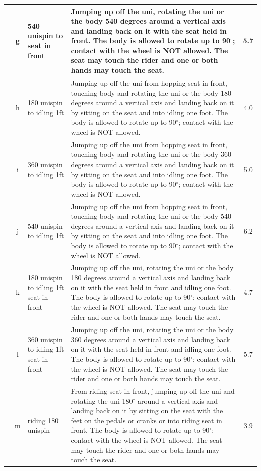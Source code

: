 \begin{longtable}{|r|c|p{4cm}|p{8cm}|c|}
\hline
  & g & 540 unispin to seat in front  & Jumping up off the uni, rotating the uni or the body 540 degrees around a vertical axis and landing back on it with the seat held in front. The body is allowed to rotate up to 90$^\circ$; contact with the wheel is NOT allowed. The seat may touch the rider and one or both hands may touch the seat.  & 5.7 \\ 
\hline
  & h & 180 unispin to idling 1ft & Jumping up off the uni from hopping seat in front, touching body and rotating the uni or the body 180 degrees around a vertical axis and landing back on it by sitting on the seat and into idling one foot. The body is allowed to rotate up to 90$^\circ$; contact with the wheel is NOT allowed.  & 4.0 \\ 
\hline
  & i & 360 unispin to idling 1ft & Jumping up off the uni from hopping seat in front, touching body and rotating the uni or the body 360 degrees around a vertical axis and landing back on it by sitting on the seat and into idling one foot. The body is allowed to rotate up to 90$^\circ$; contact with the wheel is NOT allowed.  & 5.0 \\ 
\hline
  & j & 540 unispin to idling 1ft & Jumping up off the uni from hopping seat in front, touching body and rotating the uni or the body 540 degrees around a vertical axis and landing back on it by sitting on the seat and into idling one foot. The body is allowed to rotate up to 90$^\circ$; contact with the wheel is NOT allowed.  & 6.2 \\ 
\hline
  & k & 180 unispin to idling 1ft seat in front & Jumping up off the uni, rotating the uni or the body 180 degrees around a vertical axis and landing back on it with the seat held in front and idling one foot. The body is allowed to rotate up to 90$^\circ$; contact with the wheel is NOT allowed. The seat may touch the rider and one or both hands may touch the seat.  & 4.7 \\ 
\hline
  & l & 360 unispin to idling 1ft seat in front & Jumping up off the uni, rotating the uni or the body 360 degrees around a vertical axis and landing back on it with the seat held in front and idling one foot. The body is allowed to rotate up to 90$^\circ$; contact with the wheel is NOT allowed. The seat may touch the rider and one or both hands may touch the seat.  & 5.7 \\ 
\hline
  & m & riding 180$^\circ$ unispin & From riding seat in front, jumping up off the uni and rotating the uni 180$^\circ$ around a vertical axis and landing back on it by sitting on the seat with the feet on the pedals or cranks or into riding seat in front. The body is allowed to rotate up to 90$^\circ$; contact with the wheel is NOT allowed. The seat may touch the rider and one or both hands may touch the seat. & 3.9 \\ 

\end{longtable}
